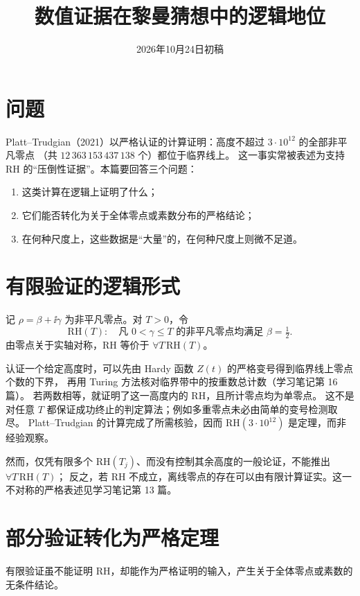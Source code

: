 \documentclass[11pt]{article}
\date{2026年10月24日初稿}
\title{数值证据在黎曼猜想中的逻辑地位}
\begin{document}
\maketitle

\par\medskip

\section{问题}
Platt--Trudgian（2021）以严格认证的计算证明：高度不超过 $3\cdot10^{12}$ 的全部非平凡零点
（共 $12\,363\,153\,437\,138$ 个）都位于临界线上。
这一事实常被表述为支持 RH 的“压倒性证据”。本篇要回答三个问题：
\begin{enumerate}
 \item 这类计算在逻辑上证明了什么；
 \item 它们能否转化为关于全体零点或素数分布的严格结论；
 \item 在何种尺度上，这些数据是“大量”的，在何种尺度上则微不足道。
\end{enumerate}

\section{有限验证的逻辑形式}
记 $\rho=\beta+\ii\gamma$ 为非平凡零点。对 $T>0$，令
\[
 \mathrm{RH}(T):\quad \text{凡 } 0<\gamma\le T \text{ 的非平凡零点均满足 } \beta=\tfrac12 .
\]
由零点关于实轴对称，$\mathrm{RH}$ 等价于 $\forall T\,\mathrm{RH}(T)$。

认证一个给定高度时，可以先由 Hardy 函数 $Z(t)$ 的严格变号得到临界线上零点个数的下界，
再用 Turing 方法核对临界带中的按重数总计数（学习笔记第 16 篇）。
若两数相等，就证明了这一高度内的 RH，且所计零点均为单零点。
这不是对任意 $T$ 都保证成功终止的判定算法；例如多重零点未必由简单的变号检测取尽。
Platt--Trudgian 的计算完成了所需核验，因而 $\mathrm{RH}(3\cdot10^{12})$ 是定理，而非经验观察。

然而，仅凭有限多个 $\mathrm{RH}(T_j)$、而没有控制其余高度的一般论证，不能推出 $\forall T\,\mathrm{RH}(T)$；
反之，若 RH 不成立，离线零点的存在可以由有限计算证实。这一不对称的严格表述见学习笔记第 13 篇。

\section{部分验证转化为严格定理}
有限验证虽不能证明 RH，却能作为严格证明的输入，产生关于全体零点或素数的无条件结论。
\end{document}
